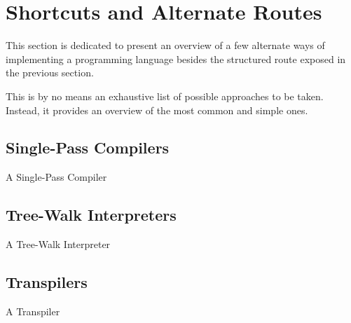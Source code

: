 \section{Shortcuts and Alternate Routes}
This section is dedicated to present an overview of a few alternate ways of implementing a programming language besides the structured route exposed in the previous section. 

This is by no means an exhaustive list of possible approaches to be taken. Instead, it provides an overview of the most common and simple ones.

\subsection{Single-Pass Compilers}
A Single-Pass Compiler

\subsection{Tree-Walk Interpreters}
A Tree-Walk Interpreter

\subsection{Transpilers}
A Transpiler

